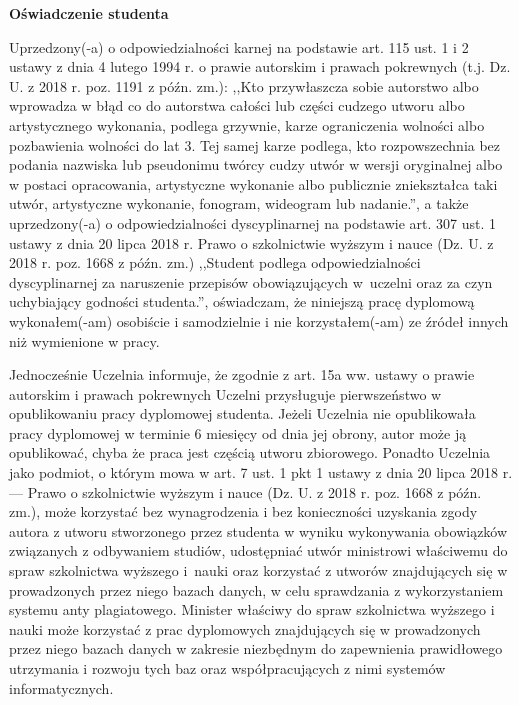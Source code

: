 \documentclass[a4paper,12pt]{article}
\begin{document}
\begin{center}
        {\bf\large\textsf{Oświadczenie studenta}}
\end{center}


{\sf Uprzedzony(-a) o odpowiedzialności karnej na podstawie art. 115 ust. 1 i 2 ustawy z dnia 4 lutego 1994 r. o prawie autorskim i prawach pokrewnych (t.j. Dz. U. z 2018 r. poz. 1191 z późn. zm.): ,,Kto przywłaszcza sobie autorstwo albo wprowadza w błąd co do autorstwa całości lub części cudzego utworu albo artystycznego wykonania, podlega grzywnie, karze ograniczenia wolności albo pozbawienia wolności do lat 3. Tej samej karze podlega, kto rozpowszechnia bez podania nazwiska lub pseudonimu twórcy cudzy utwór w wersji oryginalnej albo w postaci opracowania, artystyczne wykonanie albo publicznie zniekształca taki utwór, artystyczne wykonanie, fonogram, wideogram lub nadanie.'', a także uprzedzony(-a) o odpowiedzialności dyscyplinarnej na podstawie art. 307 ust. 1 ustawy z dnia 20 lipca 2018 r. Prawo o szkolnictwie wyższym i nauce (Dz. U. z 2018 r. poz. 1668 z późn. zm.) ,,Student podlega odpowiedzialności dyscyplinarnej za naruszenie przepisów obowiązujących w~uczelni oraz za czyn uchybiający godności studenta.'', oświadczam, że niniejszą pracę dyplomową wykonałem(-am) osobiście i samodzielnie i nie korzystałem(-am) ze źródeł innych niż wymienione w pracy.

\bigskip

Jednocześnie Uczelnia informuje, że zgodnie z art. 15a ww. ustawy o prawie autorskim i prawach pokrewnych Uczelni przysługuje pierwszeństwo w opublikowaniu pracy dyplomowej studenta. Jeżeli Uczelnia nie opublikowała pracy dyplomowej w terminie 6 miesięcy od dnia jej obrony, autor może ją opublikować, chyba że praca jest częścią utworu zbiorowego. Ponadto Uczelnia jako podmiot, o którym mowa w art. 7 ust. 1 pkt 1 ustawy z dnia 20 lipca 2018 r. --- Prawo o szkolnictwie wyższym i nauce (Dz. U. z 2018 r. poz. 1668 z późn. zm.), może korzystać bez wynagrodzenia i bez konieczności uzyskania zgody autora z utworu stworzonego przez studenta w wyniku wykonywania obowiązków związanych z odbywaniem studiów, udostępniać utwór ministrowi właściwemu do spraw szkolnictwa wyższego i~nauki oraz korzystać z utworów znajdujących się w prowadzonych przez niego bazach danych, w celu sprawdzania z wykorzystaniem systemu anty plagiatowego. Minister właściwy do spraw szkolnictwa wyższego i nauki może korzystać z prac dyplomowych znajdujących się w prowadzonych przez niego bazach danych w zakresie niezbędnym do zapewnienia prawidłowego utrzymania i rozwoju tych baz oraz współpracujących z nimi systemów informatycznych.}
\end{document}

